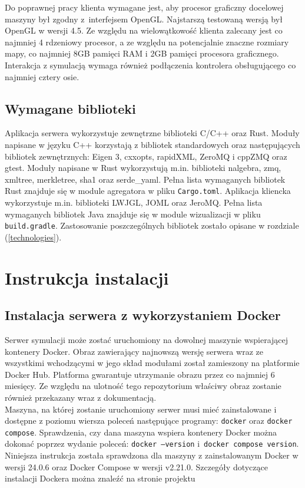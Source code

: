 Do poprawnej pracy klienta wymagane jest, aby procesor graficzny docelowej maszyny był zgodny z~interfejsem OpenGL. Najstarszą testowaną wersją był OpenGL w wersji 4.5. Ze względu na wielowątkowość klienta zalecany jest co najmniej 4 rdzeniowy procesor, a ze względu na potencjalnie znaczne rozmiary mapy, co najmniej 8GB pamięci RAM i 2GB pamięci procesora graficznego.
\\

Interakcja z symulacją wymaga również podłączenia kontrolera obsługującego co najmniej cztery osie.

\subsection{Wymagane biblioteki} \label{libraries}

Aplikacja serwera wykorzystuje zewnętrzne biblioteki C/C++ oraz Rust. Moduły napisane w języku C++ korzystają z bibliotek standardowych oraz następujących bibliotek zewnętrznych: Eigen 3, cxxopts, rapidXML, ZeroMQ i cppZMQ oraz gtest.
Moduły napisane w Rust wykorzystują m.in. biblioteki nalgebra, zmq, xmltree, merkletree, sha1 oraz serde\_yaml. Pełna lista wymaganych bibliotek Rust znajduje się w module agregatora w pliku \texttt{Cargo.toml}.
Aplikacja kliencka wykorzystuje m.in. biblioteki LWJGL, JOML oraz JeroMQ. Pełna lista wymaganych bibliotek Java znajduje się w module wizualizacji w pliku \texttt{build.gradle}.  Zastosowanie poszczególnych bibliotek zostało opisane w rozdziale (\ref{technologies}).


\section{Instrukcja instalacji}
\subsection{Instalacja serwera z wykorzystaniem Docker} \label{docker_server}

Serwer symulacji może zostać uruchomiony na dowolnej maszynie wspierającej kontenery Docker. Obraz zawierający najnowszą wersję serwera wraz ze wszystkimi wchodzącymi w jego skład modułami został zamieszony na platformie Docker Hub. Platforma gwarantuje utrzymanie obrazu przez co najmniej 6 miesięcy. Ze względu na ulotność tego repozytorium właściwy obraz zostanie również przekazany wraz z dokumentacją.\\

Maszyna, na której zostanie uruchomiony serwer musi mieć zainstalowane i dostępne z poziomu wiersza poleceń następujące programy: \texttt{docker} oraz \texttt{docker compose}. Sprawdzenia, czy dana maszyna wspiera kontenery Docker można dokonać poprzez wydanie poleceń: \texttt{docker --version} i~\texttt{docker compose version}. Niniejsza instrukcja została sprawdzona dla maszyny z zainstalowanym Docker w wersji 24.0.6 oraz Docker Compose w wersji v2.21.0. Szczegóły dotyczące instalacji Dockera można znaleźć na stronie projektu \cite{docker}\\


